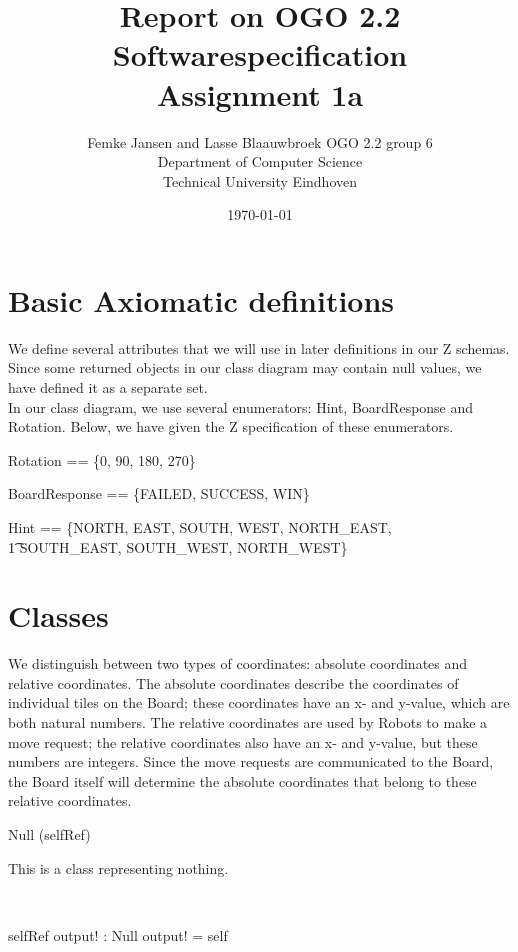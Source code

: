 \documentclass[12pt]{article}
\title{Report on OGO 2.2 Softwarespecification\\ Assignment 1a}
\author{
        Femke Jansen and Lasse Blaauwbroek OGO 2.2 group 6 \\
                Department of Computer Science\\
        Technical University Eindhoven\\
}
\date{\today}
\begin{document}
\maketitle

\begin{abstract}

\end{abstract}

\section{Basic Axiomatic definitions}
We define several attributes that we will use in later definitions in our Z schemas. Since some returned objects in our class diagram may contain null values, we have defined it as a separate set. \\
In our class diagram, we use several enumerators: Hint, BoardResponse and Rotation. Below, we have given the Z specification of these enumerators.

\begin{axdef}
Rotation == \{0, 90, 180, 270\}
\end{axdef}

\begin{axdef}
BoardResponse == \{FAILED, SUCCESS, WIN\}
\end{axdef}

\begin{axdef}
Hint == \{NORTH, EAST, SOUTH, WEST, NORTH\_EAST, \\ \t1 SOUTH\_EAST, SOUTH\_WEST, NORTH\_WEST\}
\end{axdef}

\section{Classes}
We distinguish between two types of coordinates: absolute coordinates and relative coordinates. The absolute coordinates describe the coordinates of individual tiles on the Board; these coordinates have an x- and y-value, which are both natural numbers. The relative coordinates are used by Robots to make a move request; the relative coordinates also have an x- and y-value, but these numbers are integers. Since the move requests are communicated to the Board, the Board itself will determine the absolute coordinates that belong to these relative coordinates.

\begin{class}{Null}
\upharpoonright (selfRef) \\
\begin{classcom}
This is a class representing nothing.
\end{classcom} \\
\begin{schema}{selfRef}
output! : Null
\where
output! = self
\end{schema}
\end{class}
\end{document}
